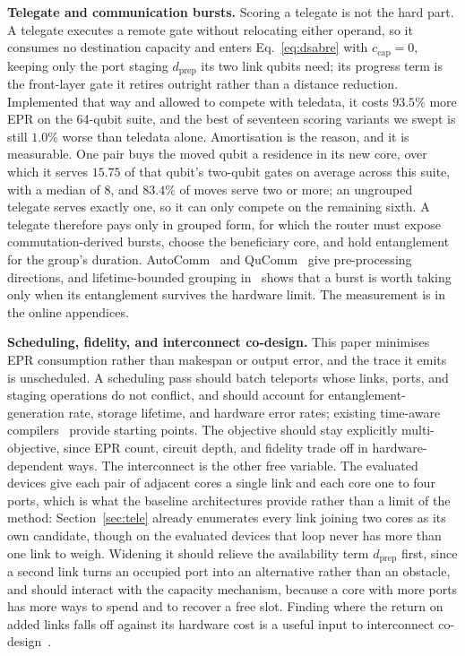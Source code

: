 \documentclass[journal]{IEEEtran}
\begin{document}
\textbf{Telegate and communication bursts.}
Scoring a telegate is not the hard part. A telegate executes a remote gate without relocating either operand, so it
consumes no destination capacity and enters Eq.~\eqref{eq:dsabre} with
$c_{\mathrm{cap}}=0$, keeping only the port staging $d_{\mathrm{prep}}$ its two
link qubits need; its progress term is the front-layer gate it retires outright
rather than a distance reduction. Implemented that way and allowed to compete
with teledata, it costs $93.5\%$ more EPR on the 64-qubit suite, and the best of
seventeen scoring variants we swept is still $1.0\%$ worse than teledata
alone.
Amortisation is the reason, and it is measurable. One pair buys the moved qubit
a residence in its new core, over which it serves $15.75$ of that qubit's
two-qubit gates on average across this suite, with a median of $8$, and $83.4\%$ of moves serve two or
more; an ungrouped telegate serves exactly one, so it can only compete on the
remaining sixth. A telegate therefore pays only
in grouped form, for which the router must expose commutation-derived bursts,
choose the beneficiary core, and hold entanglement for the group's duration.
AutoComm~\cite{wu2022autocomm} and QuComm~\cite{wu2023qucomm} give
pre-processing directions, and lifetime-bounded grouping
in~\cite{bandini2026optimized} shows that a burst is worth taking only when its
entanglement survives the hardware limit. The measurement is in the online
appendices.

\textbf{Scheduling, fidelity, and interconnect co-design.}
This paper minimises EPR consumption rather than makespan or output error, and
the trace it emits is unscheduled. A scheduling pass should batch teleports
whose links, ports, and staging operations do not conflict, and should account
for entanglement-generation rate, storage lifetime, and hardware error rates;
existing time-aware compilers~\cite{baker2020time,ferrari2021compiler} provide
starting points. The objective should stay explicitly multi-objective, since
EPR count, circuit depth, and fidelity trade off in hardware-dependent ways.
The interconnect is the other free variable. The evaluated devices give each
pair of adjacent cores a single link and each core one to four ports, which
is what the baseline architectures provide rather than a limit of the method:
Section~\ref{sec:tele} already enumerates every link joining two cores as
its own candidate, though on the evaluated devices that loop never has more
than one link to weigh.
Widening it should relieve the availability term $d_{\mathrm{prep}}$ first,
since a second link turns an occupied port into an alternative rather than an
obstacle, and should interact with the capacity mechanism, because a core with
more ports has more ways to spend and to recover a free slot. Finding where
the return on added links falls off against its hardware cost is a useful
input to interconnect
co-design~\cite{escofet2023interconnect,wu2023qucomm,liu2025codesign}.
\end{document}
